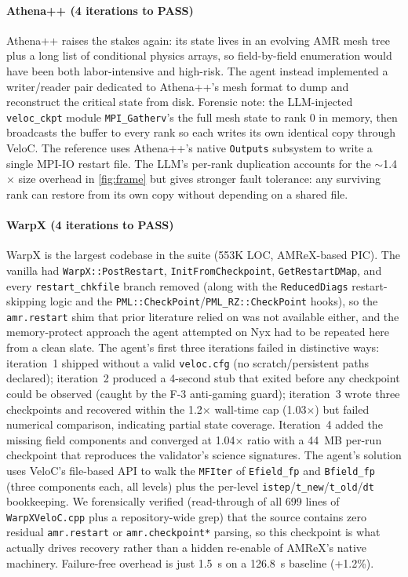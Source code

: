 \documentclass[conference]{IEEEtran}
\begin{document}
\paragraph{Athena++ (4 iterations to PASS)}
Athena++ raises the stakes again: its state lives in an evolving AMR mesh tree plus a long list of conditional physics arrays, so field-by-field enumeration would have been both labor-intensive and high-risk. The agent instead implemented a writer/reader pair dedicated to Athena++'s mesh format to dump and reconstruct the critical state from disk. Forensic note: the LLM-injected \texttt{veloc\_ckpt} module \texttt{MPI\_Gatherv}'s the full mesh state to rank 0 in memory, then broadcasts the buffer to every rank so each writes its own identical copy through VeloC. The reference uses Athena++'s native \texttt{Outputs} subsystem to write a single MPI-IO restart file. The LLM's per-rank duplication accounts for the $\sim$1.4$\times$ size overhead in \autoref{fig:frame} but gives stronger fault tolerance: any surviving rank can restore from its own copy without depending on a shared file.

\paragraph{WarpX (4 iterations to PASS)}
WarpX is the largest codebase in the suite (553K LOC, AMReX-based PIC). The vanilla had \texttt{WarpX::PostRestart}, \texttt{InitFromCheckpoint}, \texttt{GetRestartDMap}, and every \texttt{restart\_chkfile} branch removed (along with the \texttt{ReducedDiags} restart-skipping logic and the \texttt{PML::CheckPoint}/\texttt{PML\_RZ::CheckPoint} hooks), so the \texttt{amr.restart} shim that prior literature relied on was not available either, and the memory-protect approach the agent attempted on Nyx had to be repeated here from a clean slate. The agent's first three iterations failed in distinctive ways: iteration~1 shipped without a valid \texttt{veloc.cfg} (no scratch/persistent paths declared); iteration~2 produced a 4-second stub that exited before any checkpoint could be observed (caught by the F-3 anti-gaming guard); iteration~3 wrote three checkpoints and recovered within the 1.2$\times$ wall-time cap (1.03$\times$) but failed numerical comparison, indicating partial state coverage. Iteration~4 added the missing field components and converged at 1.04$\times$ ratio with a 44~MB per-run checkpoint that reproduces the validator's science signatures. The agent's solution uses VeloC's file-based API to walk the \texttt{MFIter} of \texttt{Efield\_fp} and \texttt{Bfield\_fp} (three components each, all levels) plus the per-level \texttt{istep}/\texttt{t\_new}/\texttt{t\_old}/\texttt{dt} bookkeeping. We forensically verified (read-through of all 699 lines of \texttt{WarpXVeloC.cpp} plus a repository-wide grep) that the source contains zero residual \texttt{amr.restart} or \texttt{amr.checkpoint*} parsing, so this checkpoint is what actually drives recovery rather than a hidden re-enable of AMReX's native machinery. Failure-free overhead is just 1.5~s on a 126.8~s baseline (+1.2\%).
\end{document}
